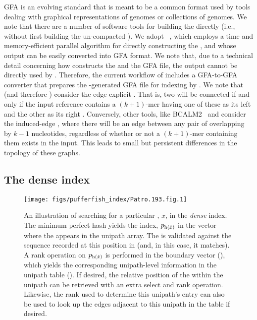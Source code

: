   GFA is an evolving standard that is meant to be a common format used by tools
  dealing with graphical representations of genomes or collections of genomes. We
  note that there are a number of software tools for building the \ccdbg directly
  (i.e., without first building the un-compacted \dbg). We adopt
  \twopaco~\citep{minkin2016twopaco}, which employs a time and memory-efficient
  parallel algorithm for directly constructing the \ccdbg, and whose output can be easily
  converted into GFA format. We note that, due to a technical detail concerning how
  \twopaco constructs the \ccdbg and the GFA file, the output cannot be directly
  used by \pufferfish. Therefore, the current workflow of \pufferfish includes a
  GFA-to-GFA converter that prepares the \twopaco-generated GFA file for indexing
  by \pufferfish. We note that \twopaco (and therefore \pufferfish)
  consider the edge-explicit \dbg.  That is, two \kmers will be connected if and only if
  the input reference contains a $(k+1)$-mer having one of these \kmers as its left \kmer and
  the other as its right \kmer.  Conversely, other tools, like BCALM2~\citep{chikhi2016compacting} and
  \kallisto consider the induced-edge \dbg, where there will be an edge between any pair of
  \kmers overlapping by $k-1$ nucleotides, regardless of whether or not a $(k+1)$-mer containing
  them exists in the input.  This leads to small but persistent differences in the topology of these
  graphs.

  \subsection*{The dense \pufferfish index}
  \setlength{\belowcaptionskip}{-10pt}
  \begin{figure*}[htb!]
    \centering
    \texttt{[image: figs/pufferfish\_index/Patro.193.fig.1]}
    \caption{{\small An illustration of searching for a particular \kmer, $x$, in the \emph{dense}
    \pufferfish index. The minimum perfect hash yields the index,
    $p_{\operatorname{h}(\hat{x})}$ in the \pos vector where the \kmer appears in the
    unipath array. The \kmer is validated against the sequence recorded at this
    position in \cseq (and, in this case, it matches). A rank operation on
    $p_{\operatorname{h}(\hat{x})}$ is performed in the boundary vector (\bv), which yields
    the corresponding unipath-level information in the unipath table (\ctab). If
    desired, the relative position of the \kmer within the unipath can be
    retrieved with an extra select and rank operation. Likewise, the rank used to
    determine this unipath's \ctab entry can also be used to look up the edges
    adjacent to this unipath in the \etab table if desired.}}
    \label{fig:dense_index}
  \end{figure*}

